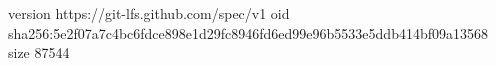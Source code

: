 version https://git-lfs.github.com/spec/v1
oid sha256:5e2f07a7c4bc6fdce898e1d29fc8946fd6ed99e96b5533e5ddb414bf09a13568
size 87544
